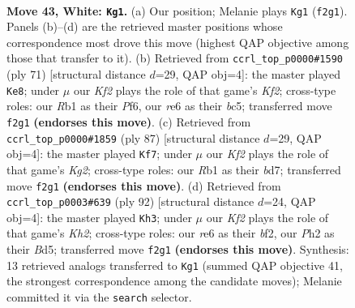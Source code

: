 \documentclass[11pt]{article}
\begin{document}
\clearpage

\begin{figure}[p]\centering
\begin{subfigure}{0.46\textwidth}\centering
\resizebox{\linewidth}{!}{%
\newchessgame
\chessboard[
  setfen={7k/3n4/4r3/8/p1p5/P1P3Pp/1BP2K1P/1R6 w - - 3 43},
  showmover=false,
  pgfstyle=straightmove, color=movearrow, markmove={f2-g1}
]}
\caption{}
\end{subfigure}\hfill
\begin{subfigure}{0.46\textwidth}\centering
\resizebox{\linewidth}{!}{%
\newchessgame
\chessboard[
  setfen={8/1p3k1p/p4p2/2BP1b1P/P7/1P3P2/3K4/8 b - - 4 36},
  showmover=false,
  pgfstyle=straightmove, color=movearrow, markmove={f7-e8}
]}
\caption{}
\end{subfigure}
\\[4pt]
\begin{subfigure}{0.46\textwidth}\centering
\resizebox{\linewidth}{!}{%
\newchessgame
\chessboard[
  setfen={8/3B2k1/4p1p1/4p3/4P2p/2P3bP/3K2P1/8 b - - 0 44},
  showmover=false,
  pgfstyle=straightmove, color=movearrow, markmove={g7-f7}
]}
\caption{}
\end{subfigure}\hfill
\begin{subfigure}{0.46\textwidth}\centering
\resizebox{\linewidth}{!}{%
\newchessgame
\chessboard[
  setfen={8/4k1p1/7p/p2B1p1P/P7/1P6/5bPK/8 w - - 3 47},
  showmover=false,
  pgfstyle=straightmove, color=movearrow, markmove={h2-h3}
]}
\caption{}
\end{subfigure}
\caption{\textbf{Move 43, White: \texttt{Kg1}.} (a) Our position; Melanie plays \texttt{Kg1} (\texttt{f2g1}). Panels (b)--(d) are the retrieved master positions whose correspondence most drove this move (highest QAP objective among those that transfer to it). (b) Retrieved from \texttt{ccrl\_top\_p0000\#1590} (ply 71) [structural distance $d$=29, QAP obj=4]: the master played \texttt{Ke8}; under $\mu$ our \emph{Kf2} plays the role of that game's \emph{Kf2}; cross-type roles: our \emph{R}b1 as their \emph{P}f6, our \emph{r}e6 as their \emph{b}c5; transferred move \texttt{f2g1} \textbf{(endorses this move)}. (c) Retrieved from \texttt{ccrl\_top\_p0000\#1859} (ply 87) [structural distance $d$=29, QAP obj=4]: the master played \texttt{Kf7}; under $\mu$ our \emph{Kf2} plays the role of that game's \emph{Kg2}; cross-type roles: our \emph{R}b1 as their \emph{b}d7; transferred move \texttt{f2g1} \textbf{(endorses this move)}. (d) Retrieved from \texttt{ccrl\_top\_p0003\#639} (ply 92) [structural distance $d$=24, QAP obj=4]: the master played \texttt{Kh3}; under $\mu$ our \emph{Kf2} plays the role of that game's \emph{Kh2}; cross-type roles: our \emph{r}e6 as their \emph{b}f2, our \emph{P}h2 as their \emph{B}d5; transferred move \texttt{f2g1} \textbf{(endorses this move)}. Synthesis: 13 retrieved analogs transferred to \texttt{Kg1} (summed QAP objective 41, the strongest correspondence among the candidate moves); Melanie committed it via the \texttt{search} selector.}
\label{fig:thought-m84}
\end{figure}
\end{document}
